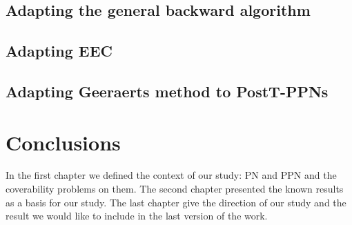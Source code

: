 \documentclass[11pt,a4paper,oneside]{book}
\theoremstyle{plain}
\theoremstyle{definition}
\theoremstyle{remark}
\begin{document}
\section{Adapting the general backward algorithm}

\section{Adapting \ac{EEC}}%

\section{Adapting Geeraerts method to PostT-\acp{PPN}}


\vspace*{0.5cm}
\acresetall
\chapter*{Conclusions}

In the first chapter we defined the context of our study: \ac{PN} and \ac{PPN} and the coverability problems on them.
The second chapter presented the known results as a basis for our study.
The last chapter give the direction of our study and the result we would like to include in the last version of the work.

\appendix

\backmatter

\printindex %



\end{document}

